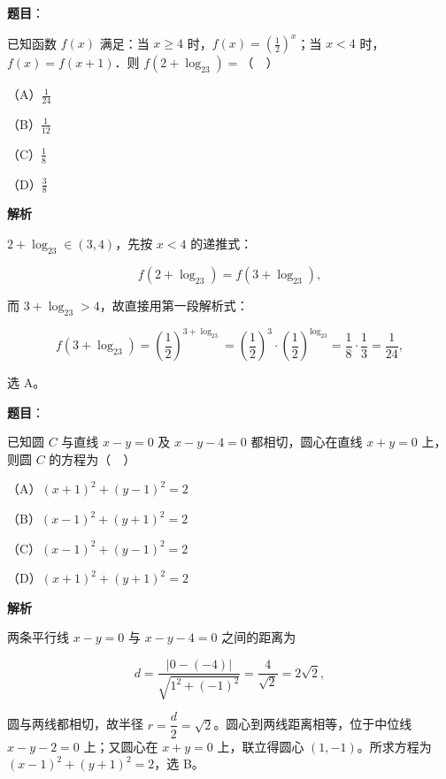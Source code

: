 \begin{answer}

\textbf{题目}：

已知函数 $f(x)$ 满足：当 $x\geqslant4$ 时，$f(x)=\left(\frac12\right)^x$；当 $x<4$ 时，$f(x)=f(x+1)$．则 $f(2+\log_23)=$（　）

（A）$\frac{1}{24}$

（B）$\frac{1}{12}$

（C）$\frac18$

（D）$\frac38$

\textbf{解析}

$2+\log_23\in(3,4)$，先按 $x<4$ 的递推式：

\nopagebreak[4]
\[f(2+\log_23)=f(3+\log_23),\]

而 $3+\log_23>4$，故直接用第一段解析式：

\nopagebreak[4]
\[f(3+\log_23)=\left(\frac12\right)^{3+\log_23}
=\left(\frac12\right)^3\cdot\left(\frac12\right)^{\log_23}
=\frac18\cdot\frac13=\frac1{24},\]

选 A。


\end{answer}
\begin{answer}

\textbf{题目}：

已知圆 $C$ 与直线 $x-y=0$ 及 $x-y-4=0$ 都相切，圆心在直线 $x+y=0$ 上，则圆 $C$ 的方程为（　）

（A）$(x+1)^2+(y-1)^2=2$

（B）$(x-1)^2+(y+1)^2=2$

（C）$(x-1)^2+(y-1)^2=2$

（D）$(x+1)^2+(y+1)^2=2$

\textbf{解析}

两条平行线 $x-y=0$ 与 $x-y-4=0$ 之间的距离为

\nopagebreak[4]
\[d=\frac{|0-(-4)|}{\sqrt{1^2+(-1)^2}}=\frac4{\sqrt2}=2\sqrt2,\]

圆与两线都相切，故半径 $r=\dfrac d2=\sqrt2$。圆心到两线距离相等，位于中位线 $x-y-2=0$ 上；又圆心在 $x+y=0$ 上，联立得圆心 $(1,-1)$。所求方程为 $(x-1)^2+(y+1)^2=2$，选 B。


\end{answer}

